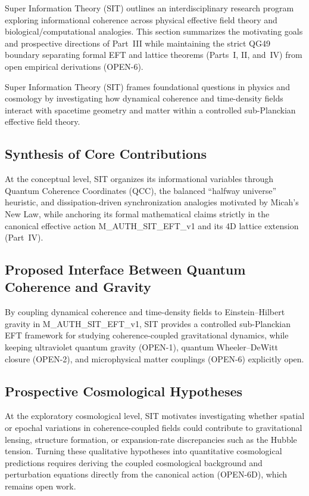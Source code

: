 \documentclass[american,11pt,letterpaper]{article}
\def\texttt#1{#1}%
\begin{document}
Super Information Theory (SIT) outlines an interdisciplinary research program exploring informational coherence across physical effective field theory and biological/computational analogies. This section summarizes the motivating goals and prospective directions of Part~III while maintaining the strict \texttt{QG49} boundary separating formal EFT and lattice theorems (Parts~I, II, and~IV) from open empirical derivations (\texttt{OPEN-6}).

Super Information Theory (SIT) frames foundational questions in physics and cosmology by investigating how dynamical coherence and time-density fields interact with spacetime geometry and matter within a controlled sub-Planckian effective field theory.

\subsection{Synthesis of Core Contributions}

At the conceptual level, SIT organizes its informational variables through Quantum Coherence Coordinates (QCC), the balanced ``halfway universe'' heuristic, and dissipation-driven synchronization analogies motivated by Micah's New Law, while anchoring its formal mathematical claims strictly in the canonical effective action \texttt{M\_AUTH\_SIT\_EFT\_v1} and its 4D lattice extension (Part~IV).

\subsection{Proposed Interface Between Quantum Coherence and Gravity}

By coupling dynamical coherence and time-density fields to Einstein--Hilbert gravity in \texttt{M\_AUTH\_SIT\_EFT\_v1}, SIT provides a controlled sub-Planckian EFT framework for studying coherence-coupled gravitational dynamics, while keeping ultraviolet quantum gravity (\texttt{OPEN-1}), quantum Wheeler--DeWitt closure (\texttt{OPEN-2}), and microphysical matter couplings (\texttt{OPEN-6}) explicitly open.

\subsection{Prospective Cosmological Hypotheses}

At the exploratory cosmological level, SIT motivates investigating whether spatial or epochal variations in coherence-coupled fields could contribute to gravitational lensing, structure formation, or expansion-rate discrepancies such as the Hubble tension. Turning these qualitative hypotheses into quantitative cosmological predictions requires deriving the coupled cosmological background and perturbation equations directly from the canonical action (\texttt{OPEN-6D}), which remains open work.
\end{document}

